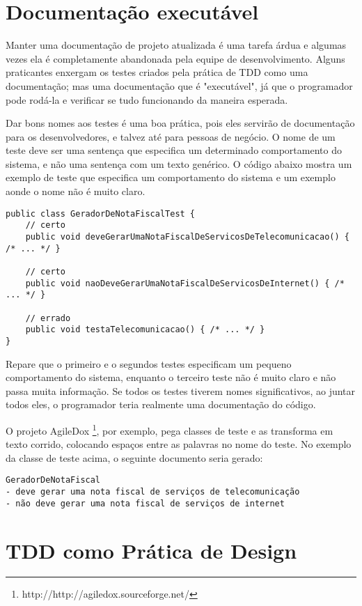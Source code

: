 \section{Documentação executável}
\label{sec:tdd-documentacao-executavel}

Manter uma documentação de projeto atualizada é uma tarefa árdua e algumas vezes ela é completamente abandonada pela equipe de desenvolvimento.
Alguns praticantes enxergam os testes criados pela prática de TDD como uma documentação; mas uma documentação que é "executável", já que o programador
pode rodá-la e verificar se tudo funcionando da maneira esperada.

Dar bons nomes aos testes é uma boa prática, pois eles servirão de documentação para os desenvolvedores, e talvez até para
pessoas de negócio. O nome de um teste deve ser uma sentença que especifica um determinado comportamento do sistema, e não uma 
sentença com um texto genérico. O código abaixo mostra um exemplo de teste que especifica um comportamento do sistema e um exemplo aonde
o nome não é muito claro.

\begin{lstlisting}[frame=trbl]
public class GeradorDeNotaFiscalTest {
	// certo
	public void deveGerarUmaNotaFiscalDeServicosDeTelecomunicacao() { /* ... */ }
	
	// certo
	public void naoDeveGerarUmaNotaFiscalDeServicosDeInternet() { /* ... */ }
	
	// errado
	public void testaTelecomunicacao() { /* ... */ }
}
\end{lstlisting}

Repare que o primeiro e o segundos testes especificam um pequeno comportamento do sistema, enquanto o terceiro teste não é muito claro e não
passa muita informação. Se todos os testes tiverem nomes significativos, ao juntar todos eles, o programador teria realmente uma
documentação do código. 

O projeto AgileDox \footnote{http://http://agiledox.sourceforge.net/}, por exemplo, pega classes de teste e as 
transforma em texto corrido, colocando espaços entre as palavras no nome do teste. No exemplo da classe de teste acima, 
o seguinte documento seria gerado:

\begin{verbatim}
GeradorDeNotaFiscal
- deve gerar uma nota fiscal de serviços de telecomunicação
- não deve gerar uma nota fiscal de serviços de internet
\end{verbatim}

\section{TDD como Prática de Design}
\label{sec:tdd-e-design}

